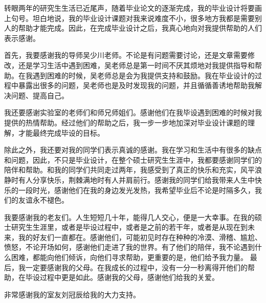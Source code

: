 \begin{acknowledgements}
转眼两年的研究生生活已近尾声，随着毕业论文的逐渐完成，我的毕业设计将要画上句号。坦白地说，我的毕业设计课题对我来说难度不小，很多地方我都是需要别人的帮助才能完成。因此，在完成毕业设计之后，我真心地向对我提供帮助的人们表示感谢。

首先，我要感谢我的导师吴少川老师。不论是有问题需要讨论，还是文章需要修改，还是学习生活中遇到困难，吴老师总是第一时间不厌其烦地对我提供指导和帮助。在我遇到困难的时候，吴老师总是会为我提供支持和鼓励。我在毕业设计的过程中暴露出很多的问题，吴老师也是及时发现我的问题，并且循循善诱地帮助我解决问题、提高自己。

我还要感谢实验室的老师们和师兄师姐们。感谢他们在我毕设遇到困难的时候对我提供的热情帮助。经过他们的帮助之后，我一步一步地加深对毕业设计课题的理解，才能最终完成毕设的目标。

除此之外，我还要对我的同学们表示真诚的感谢。我在学习和生活中有很多的缺点和问题，因此，不只是毕业设计，在整个硕士研究生生涯中，我都要感谢同学们的陪伴和帮助。和我的同学们共同走过两年，我感受到了真正的快乐和充实，风平浪静时有人分享快乐，荆棘满地时有人并肩前行。感谢我的同学们给我带来人生中快乐的一段时光，感谢他们在我的身边发光发热，我希望毕业后不论是时隔多久，我们的友谊永不褪色。

我要感谢我的老友们。人生短短几十年，能得几人交心，便是一大幸事。在我的硕士研究生生涯里，或者是毕设过程中，或者是之前的若干年，或者是从现在到未来，我的好友们一直都在。感谢他们，可能初见时存在种种的冷漠、滑稽、尴尬、愤怒，不论开场如何，感谢他们走进了我的世界。有了他们的陪伴，我不论遇到什么困难，都能向他们倾诉，向他们寻求帮助，更重要的是，他们给予我力量。
最后，我一定要感谢我的父母。在我成长的过程中，没有一分一秒离得开他们的帮助，在毕设过程中更是如此。感谢我的父母，感谢他们给我的关爱。

非常感谢我的室友刘冠辰给我的大力支持。

\end{acknowledgements}
